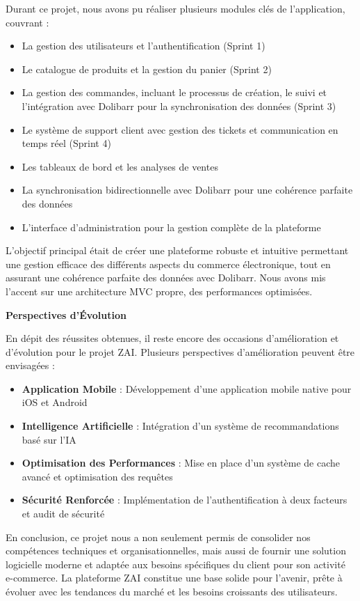 \documentclass[12pt,a4paper]{report}
\begin{document}
Durant ce projet, nous avons pu réaliser plusieurs modules clés de l'application, couvrant :
\begin{itemize}
\item La gestion des utilisateurs et l'authentification (Sprint 1)
\item Le catalogue de produits et la gestion du panier (Sprint 2)
\item La gestion des commandes, incluant le processus de création, le suivi et l'intégration avec Dolibarr pour la synchronisation des données (Sprint 3)
\item Le système de support client avec gestion des tickets et communication en temps réel (Sprint 4)
\item Les tableaux de bord et les analyses de ventes
\item La synchronisation bidirectionnelle avec Dolibarr pour une cohérence parfaite des données
\item L'interface d'administration pour la gestion complète de la plateforme
\end{itemize}

L'objectif principal était de créer une plateforme robuste et intuitive permettant une gestion efficace des différents aspects du commerce électronique, tout en assurant une cohérence parfaite des données avec Dolibarr. Nous avons mis l'accent sur une architecture MVC propre, des performances optimisées. 

\vspace{1cm}
\textbf{Perspectives d'Évolution}

En dépit des réussites obtenues, il reste encore des occasions d'amélioration et d'évolution pour le projet ZAI. Plusieurs perspectives d'amélioration peuvent être envisagées :

\begin{itemize}
\item \textbf{Application Mobile} : Développement d'une application mobile native pour iOS et Android
\item \textbf{Intelligence Artificielle} : Intégration d'un système de recommandations basé sur l'IA
\item \textbf{Optimisation des Performances} : Mise en place d'un système de cache avancé et optimisation des requêtes
\item \textbf{Sécurité Renforcée} : Implémentation de l'authentification à deux facteurs et audit de sécurité
\end{itemize}

\vspace{0.5cm}
En conclusion, ce projet nous a non seulement permis de consolider nos compétences techniques et organisationnelles, mais aussi de fournir une solution logicielle moderne et adaptée aux besoins spécifiques du client pour son activité e-commerce. La plateforme ZAI constitue une base solide pour l'avenir, prête à évoluer avec les tendances du marché et les besoins croissants des utilisateurs.
\end{document}
